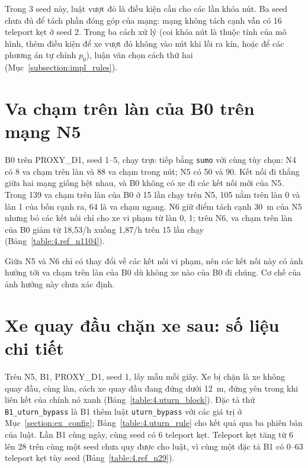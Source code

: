 \documentclass[../main.tex]{subfiles}
\begin{document}
Trong 3 seed này, luật vượt đỏ là điều kiện cần cho các lần khóa nút. Ba seed chưa đủ để tách phần đóng góp của mạng: mạng không tách cạnh vẫn có 16 teleport kẹt ở seed 2. Trong ba cách xử lý (coi khóa nút là thuộc tính của mô hình, thêm điều kiện để xe vượt đỏ không vào nút khi lối ra kín, hoặc để các phương án tự chỉnh $p_0$), luận văn chọn cách thứ hai (Mục~\ref{subsection:impl_rules}).

\section{Va chạm trên làn của B0 trên mạng N5}
\label{subsection:split_collisions}

B0 trên PROXY\_D1, seed 1--5, chạy trực tiếp bằng \texttt{sumo} với cùng tùy chọn: N4 có 8 va chạm trên làn và 88 va chạm trong nút; N5 có 50 và 90. Kết nối đi thẳng giữa hai mạng giống hệt nhau, và B0 không có xe đi các kết nối mới của N5. Trong 139 va chạm trên làn của B0 ở 15 lần chạy trên N5, 105 nằm trên làn 0 và làn 1 của bốn cạnh ra, 64 là va chạm ngang. N6 giữ điểm tách cạnh 30~m của N5 nhưng bỏ các kết nối chỉ cho xe vi phạm từ làn 0, 1; trên N6, va chạm trên làn của B0 giảm từ 18,53/h xuống 1,87/h trên 15 lần chạy (Bảng~\ref{table:4.ref_n1104}).

Giữa N5 và N6 chỉ có thay đổi về các kết nối vi phạm, nên các kết nối này có ảnh hưởng tới va chạm trên làn của B0 dù không xe nào của B0 đi chúng. Cơ chế của ảnh hưởng này chưa xác định.

\section{Xe quay đầu chặn xe sau: số liệu chi tiết}
\label{subsection:uturn_detail}

Trên N5, B1, PROXY\_D1, seed 1, lấy mẫu mỗi giây. Xe bị chặn là xe không quay đầu, cùng làn, cách xe quay đầu đang đứng dưới 12~m, đứng yên trong khi liên kết của chính nó xanh (Bảng~\ref{table:4.uturn_block}). Đặc tả thử \texttt{B1\_uturn\_bypass} là B1 thêm luật \texttt{uturn\_bypass} với các giá trị ở Mục~\ref{section:ex_config}; Bảng~\ref{table:4.uturn_rule} cho kết quả qua ba phiên bản của luật. Lần B1 cùng ngày, cùng seed có 6 teleport kẹt. Teleport kẹt tăng từ 6 lên 28 trên cùng một seed chưa quy được cho luật, vì cùng một đặc tả B1 có 0--63 teleport kẹt tùy seed (Bảng~\ref{table:4.ref_n29}).
\end{document}
